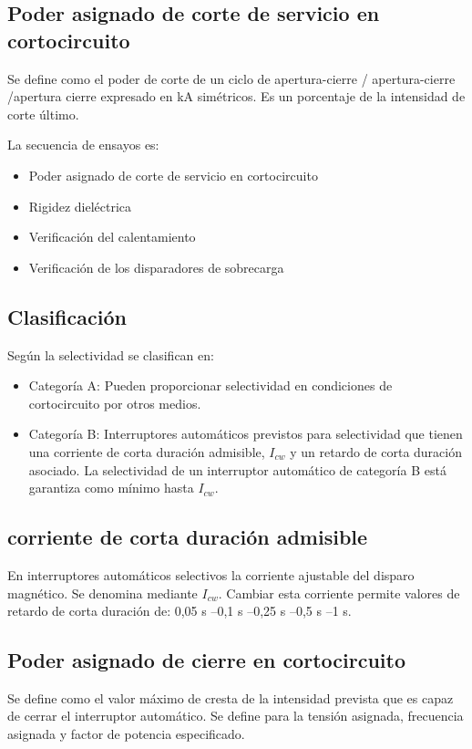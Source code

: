 \subsection{Poder asignado de corte de servicio en cortocircuito}
Se define como el poder de corte de un ciclo de apertura-cierre / apertura-cierre /apertura cierre expresado en kA simétricos. Es un porcentaje de la intensidad de corte último.
\newline

La secuencia de ensayos es:
\begin{itemize}
	\item Poder asignado de corte de servicio en cortocircuito
	\item Rigidez dieléctrica
	\item Verificación del calentamiento
	\item Verificación de los disparadores de sobrecarga 
\end{itemize}
\subsection{Clasificación}
Según la selectividad se clasifican en:
\begin{itemize}
	\item Categoría A: Pueden proporcionar selectividad en condiciones de cortocircuito por otros medios.
	\item Categoría B: Interruptores automáticos previstos para selectividad que tienen una corriente de corta duración admisible, $I_{cw}$ y un retardo de corta duración asociado. La selectividad de un interruptor automático de categoría B está garantiza como mínimo hasta $I_{cw}$.
\end{itemize}


\subsection{corriente de corta duración admisible}
En interruptores automáticos selectivos la corriente ajustable del disparo magnético. Se denomina mediante $I_{cw}$. Cambiar esta corriente permite valores de retardo de corta duración de: 0,05 s –0,1 s –0,25 s –0,5 s –1 s. 
\subsection{Poder asignado de cierre en cortocircuito}
Se define como el valor máximo de cresta de la intensidad prevista que es capaz de cerrar el interruptor automático. Se define para la tensión asignada, frecuencia asignada y factor de potencia especificado.
\newline

